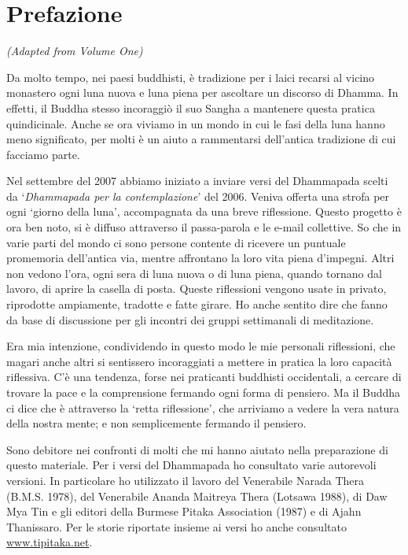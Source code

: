 \chapter{Prefazione}

{\centering
\emph{(Adapted from Volume One)}
\par}

\bigskip

\noindent
Da molto tempo, nei paesi buddhisti, è tradizione per i laici recarsi al
vicino monastero ogni luna nuova e luna piena per ascoltare un discorso
di Dhamma. In effetti, il Buddha stesso incoraggiò il suo Sangha a
mantenere questa pratica quindicinale. Anche se ora viviamo in un mondo
in cui le fasi della luna hanno meno significato, per molti è un aiuto a
rammentarsi dell'antica tradizione di cui facciamo parte.

Nel settembre del 2007 abbiamo iniziato a inviare versi del Dhammapada
scelti da `\emph{Dhammapada per la contemplazione}' del 2006. Veniva
offerta una strofa per ogni `giorno della luna', accompagnata da una
breve riflessione. Questo progetto è ora ben noto, si è diffuso
attraverso il passa-parola e le e-mail collettive. So che in varie parti
del mondo ci sono persone contente di ricevere un puntuale promemoria
dell'antica via, mentre affrontano la loro vita piena d'impegni. Altri
non vedono l'ora, ogni sera di luna nuova o di luna piena, quando
tornano dal lavoro, di aprire la casella di posta. Queste riflessioni
vengono usate in privato, riprodotte ampiamente, tradotte e fatte
girare. Ho anche sentito dire che fanno da base di discussione per gli
incontri dei gruppi settimanali di meditazione.

Era mia intenzione, condividendo in questo modo le mie personali
riflessioni, che magari anche altri si sentissero incoraggiati a mettere
in pratica la loro capacità riflessiva. C'è una tendenza, forse nei
praticanti buddhisti occidentali, a cercare di trovare la pace e la
comprensione fermando ogni forma di pensiero. Ma il Buddha ci dice che è
attraverso la `retta riflessione', che arriviamo a vedere la vera natura
della nostra mente; e non semplicemente fermando il pensiero.

Sono debitore nei confronti di molti che mi hanno aiutato nella
preparazione di questo materiale. Per i versi del Dhammapada ho
consultato varie autorevoli versioni. In particolare ho utilizzato il
lavoro del Venerabile Narada Thera (B.M.S. 1978), del Venerabile Ananda
Maitreya Thera (Lotsawa 1988), di Daw Mya Tin e gli editori della
Burmese Pitaka Association (1987) e di Ajahn Thanissaro. Per le storie
riportate insieme ai versi ho anche consultato
\href{http://www.tipitaka.net/}{www.tipitaka.net}.

